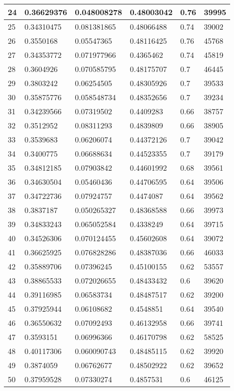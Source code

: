 \begin{longtable}{|l|l|l|l|l|l|}
24 & 0.36629376 & 0.048008278 & 0.48003042 & 0.76 & 39995 \\ \hline 
25 & 0.34310475 & 0.081381865 & 0.48066488 & 0.74 & 39002 \\ \hline 
26 & 0.3550168 & 0.05547365 & 0.48116425 & 0.76 & 45768 \\ \hline 
27 & 0.34353772 & 0.071977966 & 0.4365462 & 0.74 & 45819 \\ \hline 
28 & 0.3604926 & 0.070585795 & 0.48175707 & 0.7 & 46445 \\ \hline 
29 & 0.3803242 & 0.06254505 & 0.48305926 & 0.7 & 39533 \\ \hline 
30 & 0.35875776 & 0.058548734 & 0.48352656 & 0.7 & 39234 \\ \hline 
31 & 0.34239566 & 0.07319502 & 0.4409283 & 0.66 & 38757 \\ \hline 
32 & 0.3512952 & 0.08311293 & 0.4839809 & 0.66 & 38905 \\ \hline 
33 & 0.3539683 & 0.06206074 & 0.44372126 & 0.7 & 39042 \\ \hline 
34 & 0.3400775 & 0.06688634 & 0.44523355 & 0.7 & 39179 \\ \hline 
35 & 0.34812185 & 0.07903842 & 0.44601992 & 0.68 & 39561 \\ \hline 
36 & 0.34630504 & 0.05460436 & 0.44706595 & 0.64 & 39506 \\ \hline 
37 & 0.34722736 & 0.07924757 & 0.4474087 & 0.64 & 39562 \\ \hline 
38 & 0.3837187 & 0.050265327 & 0.48368588 & 0.66 & 39973 \\ \hline 
39 & 0.34833243 & 0.065052584 & 0.4338249 & 0.64 & 39715 \\ \hline 
40 & 0.34526306 & 0.070124455 & 0.45602608 & 0.64 & 39072 \\ \hline 
41 & 0.36625925 & 0.076828286 & 0.48387036 & 0.66 & 46033 \\ \hline 
42 & 0.35889706 & 0.07396245 & 0.45100155 & 0.62 & 53557 \\ \hline 
43 & 0.38865533 & 0.072026655 & 0.48433432 & 0.6 & 39620 \\ \hline 
44 & 0.39116985 & 0.06583734 & 0.48487517 & 0.62 & 39200 \\ \hline 
45 & 0.37925944 & 0.06108682 & 0.4548851 & 0.64 & 39540 \\ \hline 
46 & 0.36550632 & 0.07092493 & 0.46132958 & 0.66 & 39741 \\ \hline 
47 & 0.3593151 & 0.06996366 & 0.46170798 & 0.62 & 58525 \\ \hline 
48 & 0.40117306 & 0.060090743 & 0.48485115 & 0.62 & 39920 \\ \hline 
49 & 0.3874059 & 0.06762677 & 0.48502922 & 0.62 & 39652 \\ \hline 
50 & 0.37959528 & 0.07330274 & 0.4857531 & 0.6 & 46125 \\ \hline 
\end{longtable}